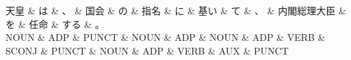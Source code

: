 \documentclass[tikz,border=5pt]{standalone}
\begin{document}
\normalsize
\begin{dependency}[edge unit distance=12.0pt]
    \begin{deptext}[column sep=1em]
        天皇 \& は \& 、 \& 国会 \& の \& 指名 \& に \& 基い \& て \& 、 \& 内閣総理大臣 \& を \& 任命 \& する \& 。\\
        NOUN \& ADP \& PUNCT \& NOUN \& ADP \& NOUN \& ADP \& VERB \& SCONJ \& PUNCT \& NOUN \& ADP \& VERB \& AUX \& PUNCT\\
    \end{deptext}
\end{dependency}
\end{document}
